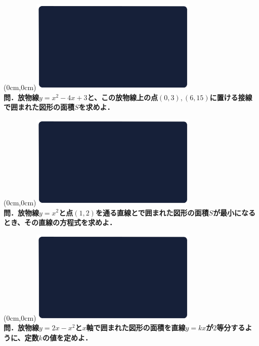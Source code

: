 \documentclass[10pt,
fleqn,
dvipdfmx,
uplatex
]{jsarticle}
\begin{document}
\at(0cm,0cm){\includegraphics[width=8cm,bb=0 0 1920 1080]{./media_local/smart_background/数II微積.jpeg}}
\vspace{0.3zw}\\
\noindent\Large 
\bf\boldmath 問．放物線$y=x^2-4x+3$と、この放物線上の点$\left(0,3\right),\left(6,{15}\right)$に置ける接線で囲まれた図形の面積$S$を求めよ．


\newpage



\at(0cm,0cm){\includegraphics[width=8cm,bb=0 0 1920 1080]{./media_local/smart_background/数II微積.jpeg}}
\vspace{0.3zw}\\
\noindent\Large 
\bf\boldmath 問．放物線$y=x^2$と点$\left(1,2\right)$を通る直線とで囲まれた図形の面積$S$が最小になるとき、その直線の方程式を求めよ．


\newpage



\at(0cm,0cm){\includegraphics[width=8cm,bb=0 0 1920 1080]{./media_local/smart_background/数II微積.jpeg}}
\vspace{0.3zw}\\
\noindent\Large 
\bf\boldmath 問．放物線$y=2x-x^2$と$x$軸で囲まれた図形の面積を直線$y=kx$が$2$等分するように、定数$k$の値を定めよ．
\end{document}
